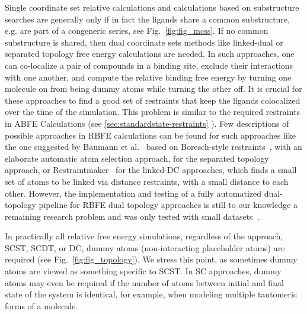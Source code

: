 \documentclass[9pt,bestpractices]{livecoms}
\begin{document}
Single coordinate set relative calculations and calculations based on substructure searches are generally only if in fact the ligands share a common substructure, e.g. are part of a congeneric series, see Fig.~\ref{fig:fig_mcss}.
If no common substructure is shared, then dual coordinate sets methods like linked-dual or separated topology free energy calculations are needed. In such approaches, one can co-localize a pair of compounds in a binding site, exclude their interactions with one another, and compute the relative binding free energy by turning one molecule on from being dummy atoms while turning the other off.
It is crucial for these approaches to find a good set of restraints that keep the ligands colocalized over the time of the simulation. This problem is similar to the required restraints in ABFE Calculations (see \ref{sec:standardstate-restraints} ). Few descriptions of possible approaches in RBFE calculations can be found for such approaches like the one suggested by Baumann et al.~\cite{baumann2023broadening} based on Boresch-style restraints~\cite{boresch2003absolute}, with an elaborate automatic atom selection approach, for the separated topology approach, or Restraintmaker~\cite{ries2022restraintmaker} for the linked-DC approaches, which finds a small set of atoms to be linked via distance restraints, with a small distance to each other. 
However, the implementation and testing of a fully automatized dual-topology pipeline for RBFE dual topology approaches is still to our knowledge a remaining research problem and was only tested with small datasets~\cite{jespers2019qligfep, rieder2022lev}.

\label{subsec: Dummy Atoms}

In practically all relative free energy simulations, regardless of the approach, SCST, SCDT, or DC, dummy atoms (non-interacting placeholder atoms) are required (see Fig.~\ref{fig:fig_topology}). We stress this point, as sometimes dummy atoms are viewed as something specific to SCST. In SC approaches, dummy atoms may even be required if the number of atoms between initial and final state of the system is identical, for example, when modeling multiple tautomeric forms of a molecule.
\end{document}
